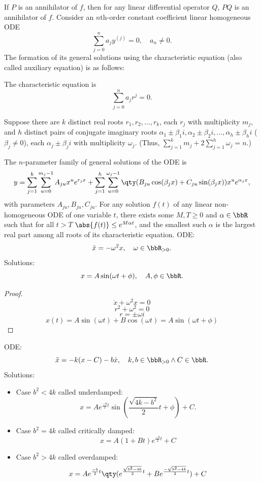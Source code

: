 \documentclass[a4paper,12pt]{report}
\begin{document}
If $P$ is an annihilator of $f$, then for any linear differential operator $Q$, $PQ$ is an annihilator of $f$.
Consider an $n$th-order constant coefficient linear homogeneous ODE
\[\sum_{j=0}^na_jy^{(j)}=0,\quad a_n\neq 0.\]
The formation of its general solutions using the characteristic equation (also called auxiliary equation) is as follows:
\ben
\item The characteristic equation is
\[\sum_{j=0}^na_jr^j=0.\]
\item Suppose there are $k$ distinct real roots $r_1,r_2,\ldots,r_k$, each $r_j$ with multiplicity $m_j$, and $h$ distinct pairs of conjugate imaginary roots $\alpha_1\pm\beta_1i,\alpha_2\pm\beta_2i,\ldots,\alpha_h\pm\beta_hi$ ($\beta_j\neq 0$), each $\alpha_j\pm\beta_ji$ with multiplicity $\omega_j$. (Thus, $\sum_{j=1}^km_j+2\sum_{j=1}^h\omega_j=n$.)
\item The $n$-parameter family of general solutions of the ODE is
\[y=\sum_{j=1}^k\sum_{u=0}^{m_j-1}A_{ju}x^ue^{r_jx}+\sum_{j=1}^h\sum_{u=0}^{\omega_j-1}\qty(B_{ju}\cos(\beta_jx)+C_{ju}\sin(\beta_jx))x^ue^{\alpha_jx},\]
with parameters $A_{ju},B_{ju},C_{ju}$.
\een
{}
For any solution $f(t)$ of any linear non-homogeneous ODE of one variable $t$, there exists some $M,T\geq 0$ and $\alpha\in\bbR$ such that for all $t>T$ $\abs{f(t)}\leq e^{M\alpha t}$, and the smallest such $\alpha$ is the largest real part among all roots of its characteristic equation.
ODE:
\[\ddot{x}=-\omega^2x,\quad\omega\in\bbR_{>0}.\]
Solutions:
\[x=A\sin(\omega t+\phi),\quad A,\phi\in\bbR.\]
\begin{proof}
\[\ddot{x}+\omega^2x=0\]
\[r^2+\omega^2=0\]
\[r=\pm\omega i\]
\[x(t)=A\sin(\omega t)+B\cos(\omega t)=A\sin(\omega t+\phi)\]
\end{proof}
ODE:
\[\ddot{x}=-k(x-C)-b\dot{x},\quad k,b\in\bbR_{>0}\land C\in\bbR.\]
Solutions:
\begin{itemize}
\item Case $b^2<4k$ called underdamped:
\[x=Ae^{\frac{-b}{2}t}\sin(\frac{\sqrt{4k-b^2}}{2}t+\phi)+C.\]
\item Case $b^2=4k$ called critically damped:
\[x=A(1+Bt)e^{\frac{-b}{2}t}+C\]
\item Case $b^2>4k$ called overdamped:
\[x=Ae^{\frac{-b}{2}t}\qty(e^{\frac{\sqrt{b^2-4k}}{2}t}+Be^{\frac{-\sqrt{b^2-4k}}{2}t})+C\]
\end{itemize}
\end{document}
